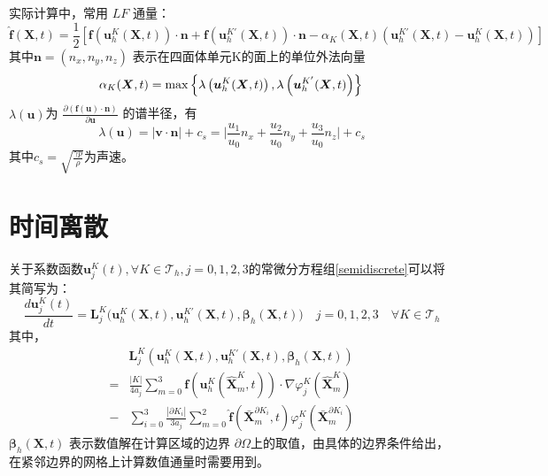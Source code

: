 \documentclass[a4paper, 12pt, UTF8]{ctexart}
\newcommand{\bs}[1]{\boldsymbol{#1}}
\begin{document}
实际计算中，常用 $LF$ 通量：
\begin{equation}
\hat{\bs f}(\bs{X}, t)=\frac{1}{2}\left[\bs f({\bs u_{h}^{K}\left(\bs{X}, t\right)}) \cdot \bs{n}+\bs f({\bs u_{h}^{K'}\left(\bs{X}, t\right)}) \cdot \bs{n}-{\alpha_{K}(\bs{X}, t)({\bs u_{h}^{K'}\left(\bs{X}, t\right)}-{\bs u_{h}^{K}\left(\bs{X}, t\right)})}\right]
\end{equation}
其中$\bs{n}=\left(n_{x}, n_{y}, n_{z}\right)$ 表示在四面体单元K的面上的单位外法向量
\begin{equation}\label{parameteralpha}
\alpha_{K}(\bs{X}, t)=\max \left\{\lambda\left({\bs u}_{h}^K(\bs{X}, t)\right), \lambda\left({\bs u}_h^{K'}(\bs{X}, t)\right)\right\}\\
\end{equation}
 $\lambda\left(\bs{u}\right)$为 $\displaystyle \frac{\partial (\bs{f}(\bs{u})\cdot \bs{n})}{\partial \bs{u}} $ 的谱半径，有
\begin{equation}\label{spectralradius}
{\lambda}(\bs{u})=|\bs{v} \cdot \bs{n}|+c_{s}=\Big|\frac{u_1}{u_0}n_x+\frac{u_2}{u_0}n_y+\frac{u_3}{u_0}n_z\Big|+c_s
\end{equation}
其中$\displaystyle c_{s}=\sqrt{\frac{\gamma{p}}{\rho}}$为声速。

\section{时间离散}
关于系数函数$\bs u_{j}^K(t), \forall K\in\mathcal T_h, j=0, 1, 2, 3$的常微分方程组\eqref{semidiscrete}可以将其简写为：
\begin{equation}\label{semidiscretescheme}
\frac{d \bs u_{j}^K(t)}{d t}=\bs L_{j}^K\big(\bs{u}_{h}^K(\bs{X}, t), \bs{u}_{h}^{K'}(\bs{X}, t), \bs{\beta}_{h}(\bs{X}, t)\big) \quad j=0,1,2,3 \quad \forall K\in\mathcal T_h
\end{equation}
其中，
\begin{equation}
\begin{split}
&\bs L_{j}^K\left(\bs u_{h}^{K}(\bs{X}, t), \bs u_{h}^{K'}(\bs{X}, t),\bs{\beta}_{h}(\bs{X}, t)\right)\\
= &\frac{|K|}{4a_j}\sum_{m=0}^{3}  \bs f\left(\bs u_{h}^K\left(\hat{\bs{X}}_{m}^K,  t\right)\right) \cdot \nabla \varphi_{j}^K\left(\hat{\bs{X}}_{m}^K\right)\\
- &\sum_{i=0}^{3}\frac{\left|\partial K_{i}\right| }{3a_j}\sum_{m=0}^{2} \hat{\bs f}\left(\bar{\bs{X}}_{m}^{\partial K_i}, t\right)\varphi_{j}^K\left(\bar{\bs{X}}_{m}^{\partial K_i}\right)
\end{split}
\end{equation}
$\bs{\beta}_{h}(\bs{X}, t)$ 表示数值解在计算区域的边界 $\partial \Omega$上的取值，由具体的边界条件给出，在紧邻边界的网格上计算数值通量时需要用到。
\end{document}
